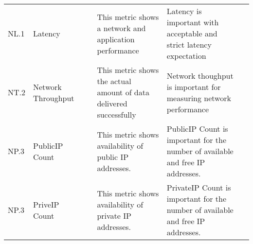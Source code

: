 \begin{table*}[p]
\begin{scriptsize}
\begin{center}
\begin{tabular}{lp{}p{}p{}p{}p{}}
\rowcolor{blue!20} \multicolumn{6}{l}{\bf Network related metrics} \\
\hline
NL.1 &
Latency &
~&
This metric shows a network and application performance &
Latency is important with acceptable and strict latency expectation &
~ \\
\hline
NT.2 &
Network Throughput&
~&
This metric shows the actual amount of data delivered successfully &
Network thoughput is important for measuring network performance &
~ \\
\hline
NP.3 &
PublicIP Count &
~&
This metric shows availability of public IP addresses. &
PublicIP Count is important for the number of available and free IP addresses. &
~ \\
\hline
NP.3 &
PriveIP Count &
~& 
This metric shows availability of private IP addresses. &
PrivateIP Count is important for the number of available and free IP addresses. &
~ \\
\hline
\end{tabular}
\end{center}
\end{scriptsize}
\end{table*}


